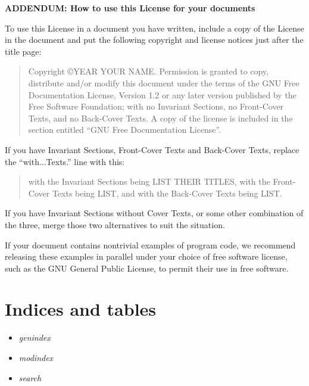 \documentclass[a4paper,12pt,english]{sphinxmanual}
\begin{document}
\textbf{ADDENDUM: How to use this License for your documents}

To use this License in a document you have written, include a copy of
the License in the document and put the following copyright and license
notices just after the title page:
\begin{quote}

Copyright ©YEAR YOUR NAME. Permission is granted to copy, distribute
and/or modify this document under the terms of the GNU Free
Documentation License, Version 1.2 or any later version published by
the Free Software Foundation; with no Invariant Sections, no
Front-Cover Texts, and no Back-Cover Texts. A copy of the license is
included in the section entitled ``GNU Free Documentation License''.
\end{quote}

If you have Invariant Sections, Front-Cover Texts and Back-Cover Texts,
replace the ``with...Texts.'' line with this:
\begin{quote}

with the Invariant Sections being LIST THEIR TITLES, with the
Front-Cover Texts being LIST, and with the Back-Cover Texts being
LIST.
\end{quote}

If you have Invariant Sections without Cover Texts, or some other
combination of the three, merge those two alternatives to suit the
situation.

If your document contains nontrivial examples of program code, we
recommend releasing these examples in parallel under your choice of free
software license, such as the GNU General Public License, to permit
their use in free software.


\chapter{Indices and tables}
\label{index:indices-and-tables}\begin{itemize}
\item {} 
\emph{genindex}

\item {} 
\emph{modindex}

\item {} 
\emph{search}

\end{itemize}
\end{document}
